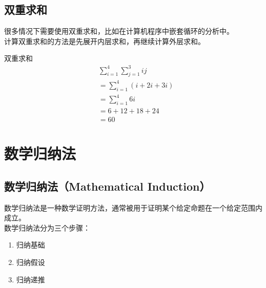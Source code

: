 \vspace{0.5cm}

\subsection{双重求和}

很多情况下需要使用双重求和，比如在计算机程序中嵌套循环的分析中。\\

计算双重求和的方法是先展开内层求和，再继续计算外层求和。

\begin{tcolorbox}
	双重求和
	\begin{align*}
		 & \sum_{i=1}^{4} \sum_{j=1}^{3} ij \\
		 & = \sum_{i=1}^{4} (i + 2i + 3i)   \\
		 & = \sum_{i=1}^{4} 6i              \\
		 & = 6 + 12 + 1 8 + 24              \\
		 & = 60
	\end{align*}
\end{tcolorbox}

\newpage

\section{数学归纳法}

\subsection{数学归纳法（Mathematical Induction）}

数学归纳法是一种数学证明方法，通常被用于证明某个给定命题在一个给定范围内成立。\\

数学归纳法分为三个步骤：

\begin{enumerate}
	\item 归纳基础
	\item 归纳假设
	\item 归纳递推
\end{enumerate}

